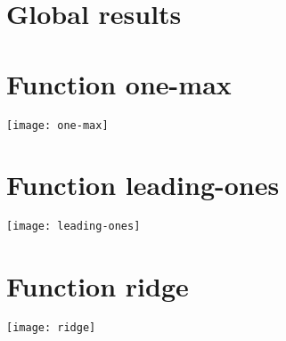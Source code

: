 \graphicspath{{../graphics/}}
\section{Global results}
\begin{center}

\end{center}
\section{Function one-max}
\begin{center}

\end{center}
\begin{center}
\texttt{[image: one-max]}
\end{center}
\section{Function leading-ones}
\begin{center}

\end{center}
\begin{center}
\texttt{[image: leading-ones]}
\end{center}
\section{Function ridge}
\begin{center}

\end{center}
\begin{center}
\texttt{[image: ridge]}
\end{center}
